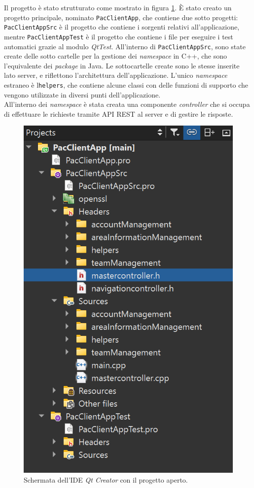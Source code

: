 Il progetto è stato strutturato come mostrato in figura \ref{fig:StrutturaProg}. È stato creato un progetto principale, nominato \texttt{PacClientApp}, che contiene due sotto progetti: \texttt{PacClientAppSrc} è il progetto che contiene i sorgenti relativi all'applicazione, mentre \texttt{PacClientAppTest} è il progetto che contiene i file per eseguire i test automatici grazie al modulo \textit{QtTest}. All'interno di \texttt{PacClientAppSrc}, sono state create delle sotto cartelle per la gestione dei \textit{namespace} in C++, che sono l'equivalente dei \textit{package} in Java. Le sottocartelle create sono le stesse inserite lato server, e riflettono l'architettura dell'applicazione. L'unico \textit{namespace} estraneo è l\texttt{helpers}, che contiene alcune classi con delle funzioni di supporto che vengono utilizzate in diversi punti dell'applicazione.  
\\
All'interno dei \textit{namespace} è stata creata una componente \textit{controller} che si occupa di effettuare le richieste tramite API REST al server e di gestire le risposte.


\begin{figure}[h!]
	\centering
	\includegraphics[width=0.4\linewidth]{./Conclusione/ImageFiles/strutturaProgettoQt}
	\caption{Schermata dell'IDE \textit{Qt Creator} con il progetto aperto.}
	\label{fig:StrutturaProg}
\end{figure}